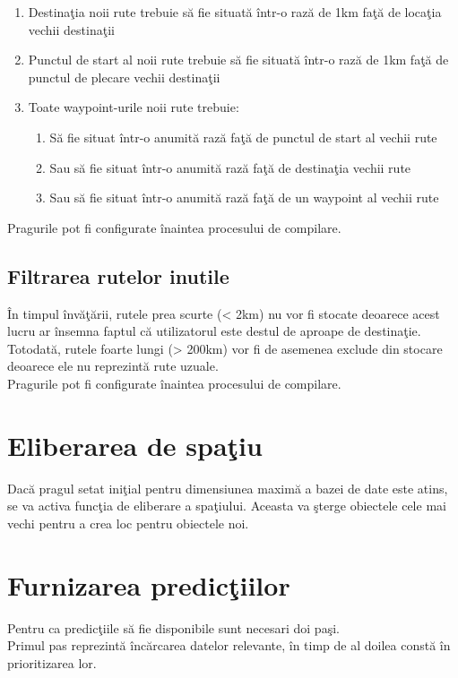 		\begin{enumerate}
	 \setlength\itemsep{0em}
		\item Destinaţia noii rute trebuie să fie situată într-o rază de 1km faţă de locaţia vechii destinaţii
		\item Punctul de start al noii rute trebuie să fie situată într-o rază de 1km faţă de punctul de plecare vechii destinaţii
		\item Toate waypoint-urile noii rute trebuie:
				\begin{enumerate}
				 \setlength\itemsep{0em}
					\item Să fie situat într-o anumită rază faţă de punctul de start al vechii rute
					\item Sau să fie situat într-o anumită rază faţă de destinaţia vechii rute
					\item Sau să fie situat într-o anumită rază faţă de un waypoint al vechii rute
				\end{enumerate}
	\end{enumerate}

Pragurile pot fi configurate înaintea procesului de compilare.


	\subsection{Filtrarea rutelor inutile}
	În timpul învăţării, rutele prea scurte (< 2km) nu vor fi stocate deoarece acest lucru ar însemna faptul că utilizatorul este destul de aproape de destinaţie.
	\vspace{6pt}
  \\Totodată, rutele foarte lungi (> 200km) vor fi de asemenea exclude din stocare deoarece ele nu reprezintă rute uzuale.
	\vspace{6pt}
  \\Pragurile pot fi configurate înaintea procesului de compilare.
	
\section{Eliberarea de spaţiu} 
Dacă pragul setat iniţial pentru dimensiunea maximă a bazei de date este atins, se va activa funcţia de eliberare a spaţiului. Aceasta va şterge obiectele cele mai vechi pentru a crea loc pentru obiectele noi.

\section{Furnizarea predicţiilor} 
Pentru ca predicţiile să fie disponibile sunt necesari doi paşi.
\vspace{6pt}
\\Primul pas reprezintă încărcarea datelor relevante, în timp de al doilea constă în prioritizarea lor.

